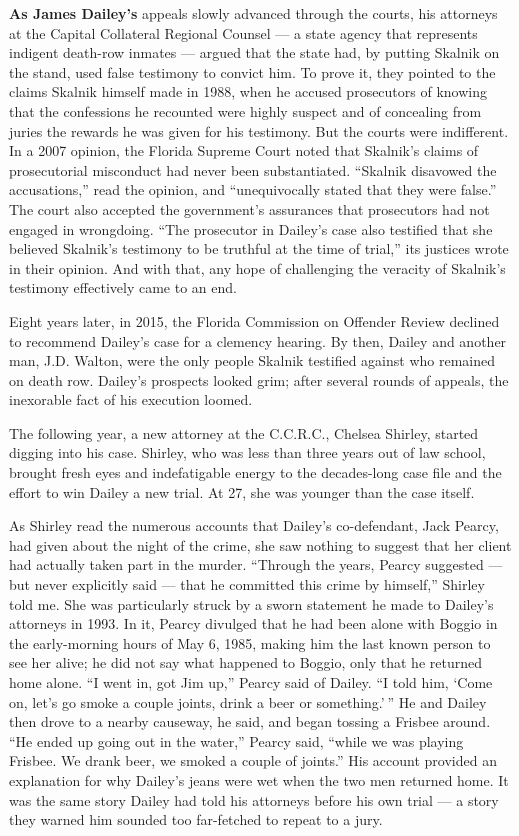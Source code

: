\textbf{As James Dailey's} appeals slowly advanced through the courts,
his attorneys at the Capital Collateral Regional Counsel --- a state
agency that represents indigent death-row inmates --- argued that the
state had, by putting Skalnik on the stand, used false testimony to
convict him. To prove it, they pointed to the claims Skalnik himself
made in 1988, when he accused prosecutors of knowing that the
confessions he recounted were highly suspect and of concealing from
juries the rewards he was given for his testimony. But the courts were
indifferent. In a 2007 opinion, the Florida Supreme Court noted that
Skalnik's claims of prosecutorial misconduct had never been
substantiated. ``Skalnik disavowed the accusations,'' read the opinion,
and ``unequivocally stated that they were false.'' The court also
accepted the government's assurances that prosecutors had not engaged in
wrongdoing. ``The prosecutor in Dailey's case also testified that she
believed Skalnik's testimony to be truthful at the time of trial,'' its
justices wrote in their opinion. And with that, any hope of challenging
the veracity of Skalnik's testimony effectively came to an end.

Eight years later, in 2015, the Florida Commission on Offender Review
declined to recommend Dailey's case for a clemency hearing. By then,
Dailey and another man, J.D. Walton, were the only people Skalnik
testified against who remained on death row. Dailey's prospects looked
grim; after several rounds of appeals, the inexorable fact of his
execution loomed.

The following year, a new attorney at the C.C.R.C., Chelsea Shirley,
started digging into his case. Shirley, who was less than three years
out of law school, brought fresh eyes and indefatigable energy to the
decades-long case file and the effort to win Dailey a new trial. At 27,
she was younger than the case itself.

As Shirley read the numerous accounts that Dailey's co-defendant, Jack
Pearcy, had given about the night of the crime, she saw nothing to
suggest that her client had actually taken part in the murder. ``Through
the years, Pearcy suggested --- but never explicitly said --- that he
committed this crime by himself,'' Shirley told me. She was particularly
struck by a sworn statement he made to Dailey's attorneys in 1993. In
it, Pearcy divulged that he had been alone with Boggio in the
early-morning hours of May 6, 1985, making him the last known person to
see her alive; he did not say what happened to Boggio, only that he
returned home alone. ``I went in, got Jim up,'' Pearcy said of Dailey.
``I told him, `Come on, let's go smoke a couple joints, drink a beer or
something.' '' He and Dailey then drove to a nearby causeway, he said,
and began tossing a Frisbee around. ``He ended up going out in the
water,'' Pearcy said, ``while we was playing Frisbee. We drank beer, we
smoked a couple of joints.'' His account provided an explanation for why
Dailey's jeans were wet when the two men returned home. It was the same
story Dailey had told his attorneys before his own trial --- a story
they warned him sounded too far-fetched to repeat to a jury.

